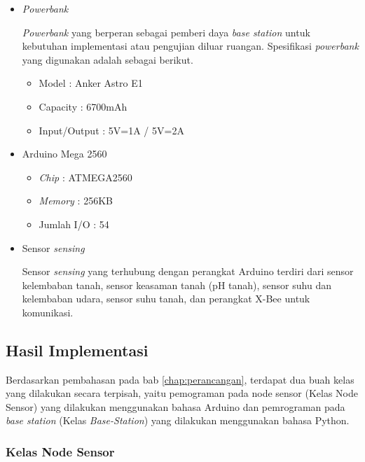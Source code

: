 \begin{itemize}
       \item \textit{Powerbank}
       
       \textit{Powerbank} yang berperan sebagai pemberi daya \textit{base station} untuk kebutuhan implementasi atau pengujian diluar ruangan. Spesifikasi \textit{powerbank} yang digunakan adalah sebagai berikut.
       
            \begin{itemize}
                \item Model : Anker Astro E1
                \item Capacity : 6700mAh
                \item Input/Output : 5V=1A / 5V=2A
            \end{itemize}
       
      
       \item Arduino Mega 2560
       
            \begin{itemize}
                \item \textit{Chip} : ATMEGA2560
                \item \textit{Memory} : 256KB
                \item Jumlah I/O : 54
            \end{itemize}
        
       
       \item Sensor \textit{sensing}
       
       Sensor \textit{sensing} yang terhubung dengan perangkat Arduino terdiri dari sensor kelembaban tanah, sensor keasaman tanah (pH tanah), sensor suhu dan kelembaban udara, sensor suhu tanah, dan perangkat X-Bee untuk komunikasi. 
       
   \end{itemize}
   
   \subsection{Hasil Implementasi}
  
   Berdasarkan pembahasan pada bab \ref{chap:perancangan}, terdapat dua buah kelas yang dilakukan secara terpisah, yaitu pemograman pada node sensor (Kelas Node Sensor) yang dilakukan menggunakan bahasa Arduino dan pemrograman pada \textit{base station} (Kelas \textit{Base-Station}) yang dilakukan menggunakan bahasa Python.
   
   \subsubsection{Kelas Node Sensor}
   

